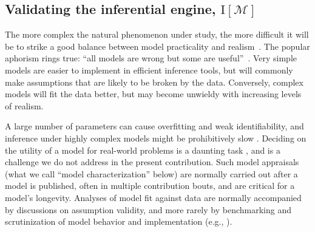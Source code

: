 \documentclass[oneside]{article}
\begin{document}
\subsection*{Validating the inferential engine, $\text{I}[\mathcal{M}]$}
\label{sec:sbc}

The more complex the natural phenomenon under study, the more difficult it will be to strike a good balance between model practicality and realism~\citep{levins1966}.
The popular aphorism rings true: ``all models are wrong but some are useful''~\citep{box79}.
Very simple models are easier to implement in efficient inference tools, but will commonly make assumptions that are likely to be broken by the data. 
Conversely, complex models will fit the data better, but may become unwieldy with increasing levels of realism.

A large number of parameters can cause overfitting and weak identifiability, and inference under highly complex models might be prohibitively slow \citep{shapiro2000}.
Deciding on the utility of a model for real-world problems is a daunting task \citep{brown18,shepherd18}, and is a challenge we do not address in the present contribution.
Such model appraisals (what we call ``model characterization'' below) are normally carried out after a model is published, often in multiple  contribution bouts, and are critical for a model's longevity.
Analyses of model fit against data are normally accompanied by discussions on assumption validity, and more rarely by benchmarking and scrutinization of model behavior and implementation (e.g., \citealp{maddison07,stadler10,rabosky13,rabosky15,moore16}).
\end{document}
